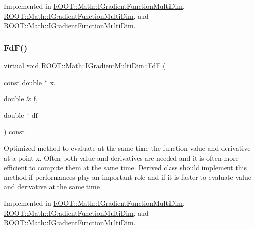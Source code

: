 Implemented in \mbox{\hyperlink{classROOT_1_1Math_1_1IGradientFunctionMultiDim_a58cefd2806ec7b9d389911800ed60386}{R\+O\+O\+T\+::\+Math\+::\+I\+Gradient\+Function\+Multi\+Dim}}, \mbox{\hyperlink{classROOT_1_1Math_1_1IGradientFunctionMultiDim_a58cefd2806ec7b9d389911800ed60386}{R\+O\+O\+T\+::\+Math\+::\+I\+Gradient\+Function\+Multi\+Dim}}, and \mbox{\hyperlink{classROOT_1_1Math_1_1IGradientFunctionMultiDim_a58cefd2806ec7b9d389911800ed60386}{R\+O\+O\+T\+::\+Math\+::\+I\+Gradient\+Function\+Multi\+Dim}}.

\mbox{\label{classROOT_1_1Math_1_1IGradientMultiDim_ad8d0e31b786327014524483a708d8f82}} 
\subsubsection{\texorpdfstring{FdF()}{FdF()}\hspace{0.1cm}{\footnotesize\ttfamily [2/3]}}
{\footnotesize\ttfamily virtual void R\+O\+O\+T\+::\+Math\+::\+I\+Gradient\+Multi\+Dim\+::\+FdF (\begin{DoxyParamCaption}\item[{const double $\ast$}]{x,  }\item[{double \&}]{f,  }\item[{double $\ast$}]{df }\end{DoxyParamCaption}) const\hspace{0.3cm}{\ttfamily [pure virtual]}}

Optimized method to evaluate at the same time the function value and derivative at a point x. Often both value and derivatives are needed and it is often more efficient to compute them at the same time. Derived class should implement this method if performances play an important role and if it is faster to evaluate value and derivative at the same time 

Implemented in \mbox{\hyperlink{classROOT_1_1Math_1_1IGradientFunctionMultiDim_a58cefd2806ec7b9d389911800ed60386}{R\+O\+O\+T\+::\+Math\+::\+I\+Gradient\+Function\+Multi\+Dim}}, \mbox{\hyperlink{classROOT_1_1Math_1_1IGradientFunctionMultiDim_a58cefd2806ec7b9d389911800ed60386}{R\+O\+O\+T\+::\+Math\+::\+I\+Gradient\+Function\+Multi\+Dim}}, and \mbox{\hyperlink{classROOT_1_1Math_1_1IGradientFunctionMultiDim_a58cefd2806ec7b9d389911800ed60386}{R\+O\+O\+T\+::\+Math\+::\+I\+Gradient\+Function\+Multi\+Dim}}.

